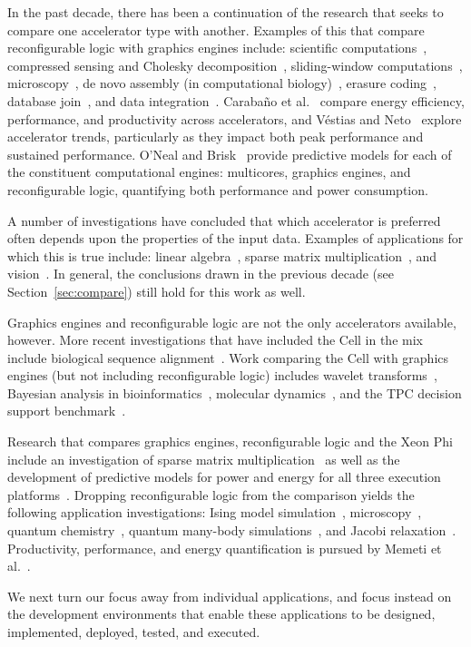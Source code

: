 In the past decade, there has been a continuation of the research that
seeks to compare one accelerator type with another. Examples of this
that compare reconfigurable logic with graphics engines include:
scientific computations~\cite{wghp11},
compressed sensing and Cholesky decomposition~\cite{ypl12},
sliding-window computations~\cite{cfbs15},
microscopy~\cite{tzwz15},
de novo assembly (in computational biology)~\cite{mjk+16},
erasure coding~\cite{czs+16},
database join~\cite{rl17},
and data integration~\cite{fcb+19}.
Caraba\~no et al.~\cite{cdde13} compare
energy efficiency, performance, and productivity across accelerators, and
V\'{e}stias and Neto~\cite{vn14} explore accelerator trends, particularly
as they impact both peak performance and sustained performance.
O'Neal and Brisk~\cite{ob18} provide predictive models for each of the
constituent
computational engines: multicores, graphics engines, and reconfigurable
logic, quantifying both performance and power consumption.

A number of investigations have concluded that which accelerator
is preferred often depends upon the properties of the input data.
Examples of applications for which this is true include:
linear algebra~\cite{gchg16,sll+13},
sparse matrix multiplication~\cite{gsbh16},
and vision~\cite{mfo+16}.
In general, the conclusions drawn in the previous decade (see
Section~\ref{sec:compare}) still hold for this work as well.

Graphics engines and reconfigurable logic are not the only accelerators
available, however.  More recent investigations that have included the Cell in
the mix include biological sequence alignment~\cite{bal+12}.
Work comparing the Cell with graphics engines (but not including
reconfigurable logic) includes
wavelet transforms~\cite{bck+11},
Bayesian analysis in bioinformatics~\cite{pts+12},
molecular dynamics~\cite{pts+12}, and the TPC decision support
benchmark~\cite{pts+12}.

Research that compares graphics engines, reconfigurable logic and
the Xeon Phi include an investigation of
sparse matrix multiplication~\cite{gsbh16} as well as the development of
predictive models for power and energy for all three
execution platforms~\cite{opr+17}.
Dropping reconfigurable logic from the comparison yields the following
application investigations:
Ising model simulation~\cite{ws13},
microscopy~\cite{tkk+14},
quantum chemistry~\cite{lrg14},
quantum many-body simulations~\cite{Lyakh15}, and
Jacobi relaxation~\cite{cv16}.
Productivity, performance, and energy quantification is pursued
by Memeti et al.~\cite{mlp+17}.

We next turn our focus away from individual applications, and focus
instead on the development environments that enable these applications
to be designed, implemented, deployed, tested, and executed.
